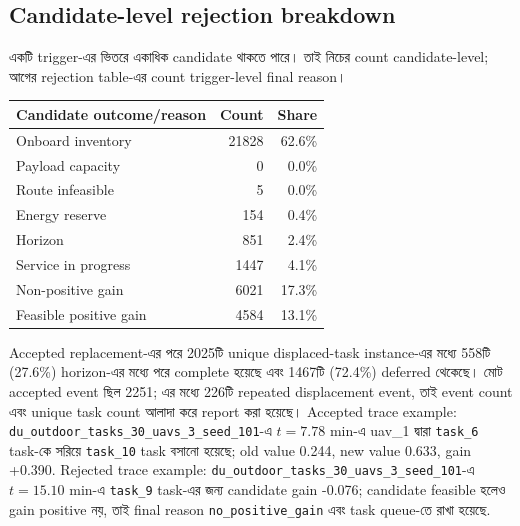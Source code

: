 \documentclass[10pt,a4paper]{article}
\begin{document}
\subsection{Candidate-level rejection breakdown}
একটি trigger-এর ভিতরে একাধিক candidate থাকতে পারে। তাই নিচের count candidate-level; আগের rejection table-এর count trigger-level final reason।
\begin{table}[H]\centering\scriptsize\begin{tabular}{@{}lrr@{}}\toprule Candidate outcome/reason & Count & Share\\\midrule
Onboard inventory & 21828 & 62.6\% \\
Payload capacity & 0 & 0.0\% \\
Route infeasible & 5 & 0.0\% \\
Energy reserve & 154 & 0.4\% \\
Horizon & 851 & 2.4\% \\
Service in progress & 1447 & 4.1\% \\
Non-positive gain & 6021 & 17.3\% \\
Feasible positive gain & 4584 & 13.1\% \\
\bottomrule\end{tabular}\end{table}
Accepted replacement-এর পরে 2025টি unique displaced-task instance-এর মধ্যে 558টি (27.6\%) horizon-এর মধ্যে পরে complete হয়েছে এবং 1467টি (72.4\%) deferred থেকেছে। মোট accepted event ছিল 2251; এর মধ্যে 226টি repeated displacement event, তাই event count এবং unique task count আলাদা করে report করা হয়েছে।
Accepted trace example: \texttt{du\_outdoor\_tasks\_30\_uavs\_3\_seed\_101}-এ $t=7.78$ min-এ uav\_1 দ্বারা \texttt{task\_6} task-কে সরিয়ে \texttt{task\_10} task বসানো হয়েছে; old value 0.244, new value 0.633, gain +0.390.
Rejected trace example: \texttt{du\_outdoor\_tasks\_30\_uavs\_3\_seed\_101}-এ $t=15.10$ min-এ \texttt{task\_9} task-এর জন্য candidate gain -0.076; candidate feasible হলেও gain positive নয়, তাই final reason \texttt{no\_positive\_gain} এবং task queue-তে রাখা হয়েছে.
\end{document}
